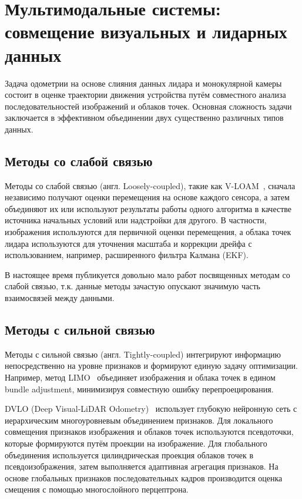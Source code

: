 \section{Мультимодальные системы: совмещение визуальных и лидарных данных}
Задача одометрии на основе слияния данных лидара и монокулярной камеры состоит 
в оценке траектории движения устройства путём совместного анализа 
последовательностей изображений и облаков точек. Основная сложность задачи 
заключается в эффективном объединении двух существенно различных типов данных.

\subsection{Методы со слабой связью}
Методы со слабой связью (англ. Loosely-coupled), такие как V-LOAM~\cite{zhang2015visual}, сначала независимо получают оценки 
перемещения на основе каждого сенсора, а затем объединяют их или используют результаты 
работы одного алгоритма в качестве источника начальных условий или надстройки для другого. 
В частности, изображения используются для первичной оценки перемещения, а облака точек лидара 
используются для уточнения масштаба и коррекции дрейфа с использованием, например, расширенного фильтра Калмана (EKF).

В настоящее время публикуется довольно мало работ посвященных методам со слабой связью,
т.к. данные методы зачастую опускают значимую часть взаимосвязей между данными. 

\subsection{Методы с сильной связью}
Методы с сильной связью (англ. Tightly-coupled) интегрируют информацию непосредственно на уровне признаков 
и формируют единую задачу оптимизации. Например, метод LIMO~\cite{graeter2018limo} объединяет изображения 
и облака точек в едином bundle adjustment, минимизируя совместную ошибку 
перепроецирования.


DVLO (Deep Visual-LiDAR Odometry)~\cite{liu2024dvlo} использует глубокую нейронную сеть с 
иерархическим многоуровневым объединением признаков. Для локального совмещения 
признаков изображения и облаков точек используются псевдоточки, которые 
формируются путём проекции на изображение. 
Для глобального объединения используется цилиндрическая проекция облаков точек 
в псевдоизображения, затем выполняется адаптивная агрегация признаков.
На основе глобальных признаков последовательных кадров производится оценка смещения
с помощью многослойного перцептрона. 

